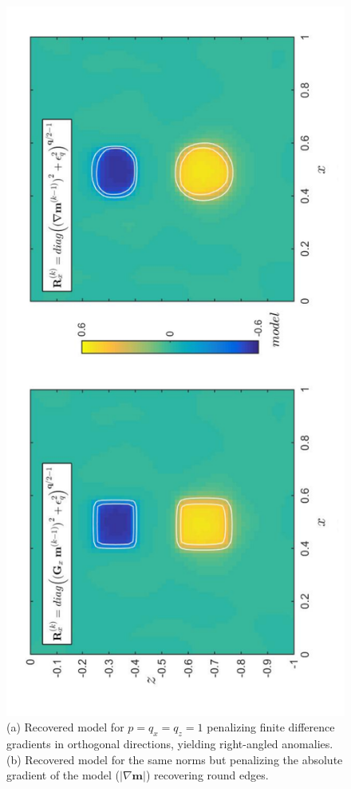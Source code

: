 \begin{figure}[h]
\centering
\includegraphics[scale=0.55, angle=270]{2D_Model_Grad_Test}
\caption{(a) Recovered model for $p = q_x = q_z = 1$ penalizing finite difference gradients in orthogonal directions, yielding right-angled anomalies. (b) Recovered model for the same norms but penalizing the absolute gradient of the model ($|\nabla \mathbf{m}|$) recovering round edges.}
\label{fig:2D_Model_Grad_Test}
\end{figure}

